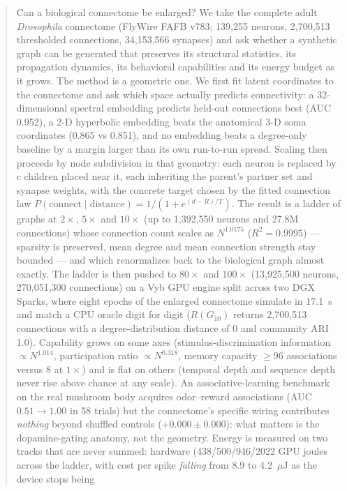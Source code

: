 \documentclass[11pt,a4paper]{article}
\begin{document}
\begin{abstract}
\noindent
Can a biological connectome be enlarged? We take the complete adult \textit{Drosophila}
connectome (FlyWire FAFB v783; 139{,}255 neurons, 2{,}700{,}513 thresholded connections,
34{,}153{,}566 synapses) and ask whether a synthetic graph can be generated that preserves its
structural statistics, its propagation dynamics, its behavioral capabilities and its energy
budget as it grows. The method is a geometric one. We first fit latent coordinates to the
connectome and ask which space actually predicts connectivity: a 32-dimensional spectral
embedding predicts held-out connections best (AUC 0.952), a 2-D hyperbolic embedding beats the
anatomical 3-D soma coordinates (0.865 vs 0.851), and no embedding beats a degree-only baseline
by a margin larger than its own run-to-run spread. Scaling then proceeds by node subdivision in
that geometry: each neuron is replaced by $c$ children placed near it, each inheriting the
parent's partner set and synapse weights, with the concrete target chosen by the fitted
connection law $P(\text{connect}\mid \text{distance}) = 1/(1+e^{(d-R)/T})$. The result is a
ladder of graphs at $2\times$, $5\times$ and $10\times$ (up to 1{,}392{,}550 neurons and 27.8M
connections) whose connection count scales as $N^{1.0175}$ ($R^2=0.9995$) --- sparsity is
preserved, mean degree and mean connection strength stay bounded --- and which renormalizes back
to the biological graph almost exactly. The ladder is then pushed to $80\times$ and $100\times$
(13{,}925{,}500 neurons, 270{,}051{,}300 connections) on a Vyb GPU engine split across two DGX
Sparks, where eight epochs of the enlarged connectome simulate in 17.1~s and match a CPU oracle
digit for digit ($R(G_{10})$ returns 2{,}700{,}513 connections with a
degree-distribution distance of 0 and community ARI 1.0). Capability grows on some axes
(stimulus-discrimination information $\propto N^{1.014}$, participation ratio $\propto
N^{0.318}$, memory capacity $\geq 96$ associations versus 8 at $1\times$) and is flat on others
(temporal depth and sequence depth never rise above chance at any scale). An associative-learning
benchmark on the real mushroom body acquires odor--reward associations (AUC $0.51\to1.00$ in 58
trials) but the connectome's specific wiring contributes \emph{nothing} beyond shuffled controls
($+0.000\pm0.000$): what matters is the dopamine-gating anatomy, not the geometry. Energy is
measured on two tracks that are never summed: hardware (438/500/946/2022 GPU joules across the
ladder, with cost per spike \emph{falling} from 8.9 to 4.2~$\mu$J as the device stops being

\end{abstract}
\end{document}
